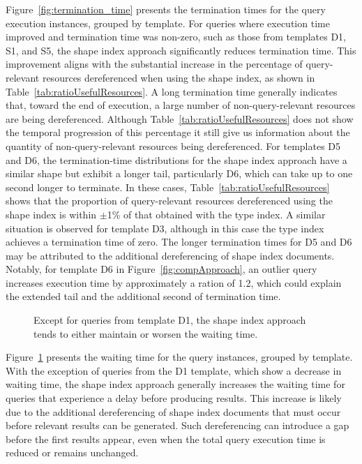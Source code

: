 Figure~\ref{fig:termination_time} presents the termination times for the query execution instances, grouped by template. 
For queries where execution time improved and termination time was non-zero, such as those from templates D1, S1, and S5, the shape index approach significantly reduces termination time. 
This improvement aligns with the substantial increase in the percentage of query-relevant resources dereferenced when using the shape index, as shown in Table~\ref{tab:ratioUsefulResources}.
A long termination time generally indicates that, toward the end of execution, a large number of non-query-relevant resources are being dereferenced. 
Although Table~\ref{tab:ratioUsefulResources} does not show the temporal progression of this percentage it still give us information about the quantity of non-query-relevant resources being dereferenced.
For templates D5 and D6, the termination-time distributions for the shape index approach have a similar shape but exhibit a longer tail, particularly D6, which can take up to one second longer to terminate. 
In these cases, Table~\ref{tab:ratioUsefulResources} shows that the proportion of query-relevant resources dereferenced using the shape index is within $\pm$1\% of that obtained with the type index.
A similar situation is observed for template D3, although in this case the type index achieves a termination time of zero. 
The longer termination times for D5 and D6 may be attributed to the additional dereferencing of shape index documents. 
Notably, for template D6 in Figure~\ref{fig:compApproach}, an outlier query increases execution time by approximately a ration of 1.2, which could explain the extended tail and the additional second of termination time.


\begin{figure}
    \centering
    
    \caption{Except for queries from template D1, the shape index approach tends to either maintain or worsen the waiting time.}
    \label{fig:waiting_time}
\end{figure}

Figure~\ref{fig:waiting_time} presents the waiting time for the query instances, grouped by template. 
With the exception of queries from the D1 template, which show a decrease in waiting time, the shape index approach generally increases the waiting time for queries that experience a delay before producing results. 
This increase is likely due to the additional dereferencing of shape index documents that must occur before relevant results can be generated. 
Such dereferencing can introduce a gap before the first results appear, even when the total query execution time is reduced or remains unchanged.


